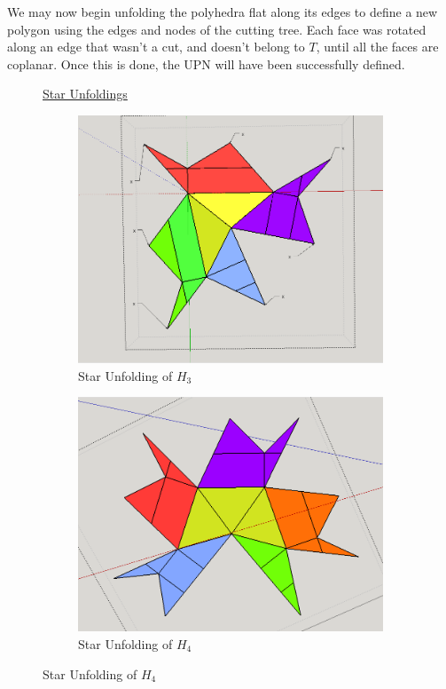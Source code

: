 \documentclass[12 pt]{article}
\begin{document}
We may now begin unfolding the polyhedra flat along its edges to define a new polygon using the edges and nodes of the cutting tree. 
Each face was rotated along an edge that wasn't a cut, and doesn't belong to $T$, until all the faces are coplanar. Once this is done, the UPN will have been successfully defined.

\begin{figure}[h]
\label{STARS}
\underline{Star Unfoldings}
\centering
\begin{subfigure}[t]{0.25\textwidth}
\caption{Star Unfolding of $H_3$}
\includegraphics[scale=0.15]{finalUNP/h3UNP.png}
\end{subfigure}%
%
\begin{subfigure}[t]{0.25\textwidth}
\caption{Star Unfolding of $H_4$ }
\centering
\includegraphics[scale=0.15]{finalUNP/h4UNP.png}

\end{subfigure}
\end{figure}
\end{document}
